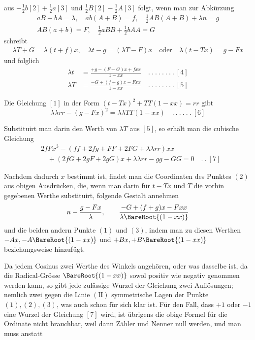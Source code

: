 %
aus \(-\frac12b[2]+\frac12a[3]\) und \(\frac12B[2]-\frac12A[3]\) folgt, wenn man zur Abkürzung
\[\begin{gathered}aB-bA=\lambda,\quad ab(A+B)=f,\quad\tfrac12AB(A+B)+\lambda n=g\\
AB(a+b)=F,\quad\tfrac12aBB+\tfrac12bAA=G\end{gathered}\]
schreibt
\[\begin{gathered}\lambda T+G=\lambda(t+f)x,\quad\lambda t-g=(\lambda T-F)x\quad\text{oder}\quad\lambda(t-Tx)=g-Fx\end{gathered}\]
und folglich
\[\begin{aligned}\lambda t&=\frac{+g-(F+G)x+fxx}{1-xx}\quad.\ .\ .\ .\ .\ .\ .\ .\ [4]\\
\lambda T&=\frac{-G+(f+g)x-Fxx}{1-xx}\quad.\ .\ .\ .\ .\ .\ .\ .\ [5]\end{aligned}\]
\par
Die Gleichung \([1]\) in der Form \((t-Tx)^2+TT(1-xx)=rr\) gibt
\[\lambda\lambda rr-(g-Fx)^2=\lambda\lambda TT(1-xx)\quad.\ .\ .\ .\ .\ .\ [6]\]
\par
Substituirt man darin den Werth von \(\lambda T\) aus \([5]\), so erhält man die cubische Gleichung
\[\begin{aligned}&2fFx^3-(ff+2fg+FF+2FG+\lambda\lambda rr)xx\\
&\quad+(2fG+2gF+2gG)x+\lambda\lambda rr-gg-GG=0\quad.\ .\ [7]\end{aligned}\]
\par
Nachdem dadurch \(x\) bestimmt ist, findet man die Coordinaten des Punktes \((2)\) aus obigen Ausdrücken, die, wenn man darin für \(t-Tx\) und \(T\) die vorhin gegebenen Werthe substituirt, folgende Gestalt annehmen
\[n-\frac{g-Fx}{\lambda},\qquad\frac{-G+(f+g)x-Fxx}{\lambda\BareRoot{(1-xx)}}\]
und die beiden andern Punkte \((1)\) und \((3)\), indem man zu diesen Werthen \(-Ax,-A\BareRoot{(1-xx)}\) und \(+Bx,+B\BareRoot{(1-xx)}\) beziehungsweise hinzufügt.

Da jedem Cosinus zwei Werthe des Winkels angehören, oder was dasselbe ist, da die Radical-Grösse \(\BareRoot{(1-xx)}\) sowol positiv wie negativ genommen werden kann, so gibt jede zulässige Wurzel der Gleichung zwei Auflösungen; nemlich zwei gegen die Linie \(\mathrm{(II)}\) symmetrische Lagen der Punkte \((1),(2),(3)\), was auch schon für sich klar ist. Für den Fall, dass \(+1\) oder \(-1\) eine Wurzel der Gleichung \([7]\) wird, ist übrigens die obige Formel für die Ordinate nicht brauchbar, weil dann Zähler und Nenner null werden, und man muss anstatt
